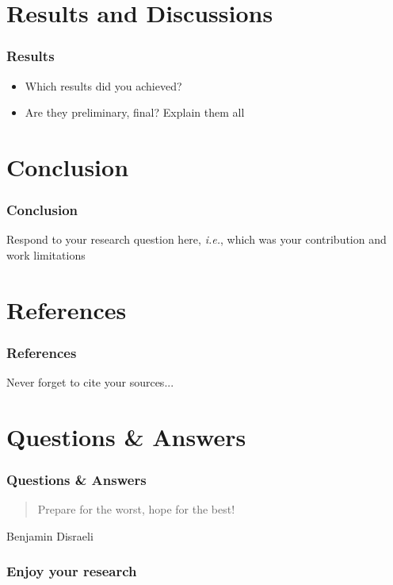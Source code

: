 \documentclass[10pt, aspectratio=169]{beamer}
\begin{document}
\section{Results and Discussions}
\begin{frame}
  \frametitle{Results}

  \begin{itemize}
  \item Which results did you achieved? \pause
  \item Are they preliminary, final? Explain them all
  \end{itemize}		
\end{frame}

\section{Conclusion}
\begin{frame}
  \frametitle{Conclusion}
  Respond to your research question here, \emph{i.e.}, which was your
  contribution and work limitations
\end{frame}


\section{References}
\begin{frame}
  \frametitle{References}
  
  \scriptsize
  Never forget to cite your sources...
  
  \nocite{Ganssle:2000aa, Liu:1973aa, Douglass:2003aa}

  \setlength\bibitemsep{\baselineskip}
  \renewcommand*{\bibfont}{\scriptsize}
  \printbibliography
\end{frame}

\section{Questions \& Answers}
\begin{frame}
  \frametitle{Questions \& Answers}

  \begin{quotation}
  Prepare for the worst, hope for the best!\\    
  \end{quotation}
  \flushright
  Benjamin Disraeli
\end{frame}

\begin{frame}
  \frametitle{Enjoy your research}
  
\end{frame}
\end{document}
